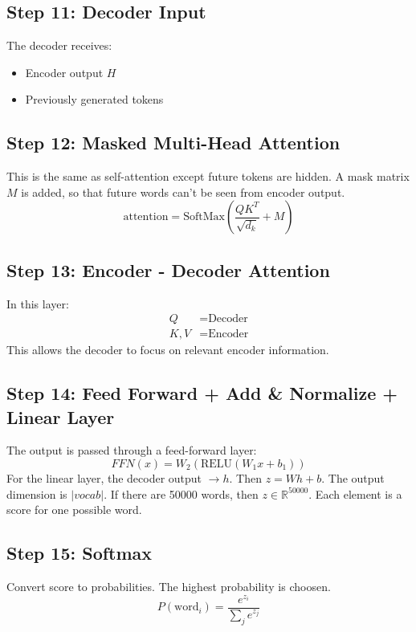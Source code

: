 \documentclass[10pt, conference]{IEEEtran}
\begin{document}
\subsection{\textbf{Step 11: Decoder Input}}
The decoder receives:
\begin{itemize}
    \item Encoder output $H$
    \item Previously generated tokens
\end{itemize}

\subsection{\textbf{Step 12: Masked Multi-Head Attention}}
This is the same as self-attention except future tokens are hidden. A mask matrix $M$ is added, so that future words can't be seen from encoder output.
\begin{equation}
    \text{attention} = \text{SoftMax}\left( \frac{QK^T}{\sqrt{d_k}} + M \right)
\end{equation}

\subsection{\textbf{Step 13: Encoder - Decoder Attention}}
In this layer:
\begin{align*}
    Q &= \text{Decoder} \\
    K, V &= \text{Encoder}
\end{align*}
This allows the decoder to focus on relevant encoder information.

\subsection{\textbf{Step 14: Feed Forward + Add \& Normalize + Linear Layer}}
The output is passed through a feed-forward layer:
\begin{equation}
    FFN(x) = W_2(\text{RELU}(W_1x + b_1))
\end{equation}
For the linear layer, the decoder output $\rightarrow h$.
Then $z = Wh + b$. The output dimension is $|vocab|$. 
If there are 50000 words, then $z \in \mathbb{R}^{50000}$. Each element is a score for one possible word.

\subsection{\textbf{Step 15: Softmax}}
Convert score to probabilities. The highest probability is choosen.
\begin{equation}
    P(\text{word}_i) = \frac{e^{z_i}}{\sum_j e^{z_j}}
\end{equation}
\end{document}
